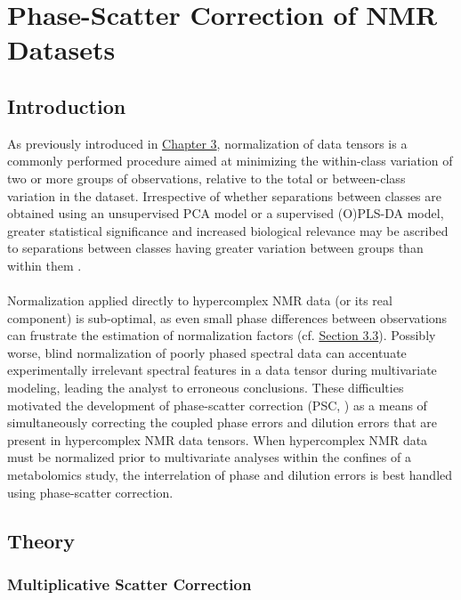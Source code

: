 
\chapter{Phase-Scatter Correction of NMR Datasets}

\section{Introduction}

\begin{doublespace}
As previously introduced in \hyperlink{chapter.3}{Chapter 3}, normalization
of data tensors is a commonly performed procedure aimed at minimizing the
within-class variation of two or more groups of observations, relative to
the total or between-class variation in the dataset. Irrespective of whether
separations between classes are obtained using an unsupervised PCA model or a
supervised (O)PLS-DA model, greater statistical significance and increased
biological relevance may be ascribed to separations between classes having
greater variation between groups than within them \cite{worley:abio2013}.
\\\\
Normalization applied directly to hypercomplex NMR data (or its real component)
is sub-optimal, as even small phase differences between observations can
frustrate the estimation of normalization factors
(cf. \hyperlink{section.3.3}{Section 3.3}). Possibly worse, blind
normalization of poorly phased spectral data can accentuate experimentally
irrelevant spectral features in a data tensor during multivariate modeling,
leading the analyst to erroneous conclusions. These difficulties motivated
the development of phase-scatter correction (PSC, \cite{worley:cils2014}) as
a means of simultaneously correcting the coupled phase errors and dilution
errors that are present in hypercomplex NMR data tensors. When hypercomplex
NMR data must be normalized prior to multivariate analyses within the confines
of a metabolomics study, the interrelation of phase and dilution errors is best
handled using phase-scatter correction.
\end{doublespace}

\section{Theory}

\subsection{Multiplicative Scatter Correction}

